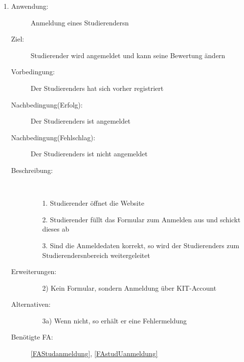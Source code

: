 \documentclass[parskip=full]{scrartcl}
\newcommand{\swtLabel}[1]{\textbf{/#1\arabic*0/}}
\begin{document}
\begin{enumerate}[label=\swtLabel{S}]
  \item \label{UCstudAnmeldung}
    \begin{description}
    \item[Anwendung:] Anmeldung eines \glspl{Studierender}n
    \item[Ziel:] \gls{Studierender} wird angemeldet und kann seine \gls{Bewertung} ändern
  	\item[Vorbedingung:] Der \glspl{Studierender} hat sich vorher registriert
  	\item[Nachbedingung(Erfolg):] Der \glspl{Studierender} ist angemeldet
  	\item[Nachbedingung(Fehlschlag):] Der \glspl{Studierender} ist nicht angemeldet
  	\item[Beschreibung:]~
  	\begin{enumerate}
  	  \item[1.] \gls{Studierender} öffnet die Website
  	  \item[2.] \gls{Studierender} füllt das Formular zum Anmelden aus und schickt
  	  dieses ab %
  	  \item[3.] Sind die Anmeldedaten korrekt, so wird der \glspl{Studierender} zum
  	  \glspl{Studierender}nbereich weitergeleitet
  	\end{enumerate}
  	\item[Erweiterungen:]
  	\begin{enumerate}
  	  \item[2)] Kein Formular, sondern Anmeldung über \gls{KIT-Account}
  	\end{enumerate}    	
  	\item[Alternativen:]
	\begin{enumerate}
  	  \item[3a)] Wenn nicht, so erhält er eine Fehlermeldung
  	\end{enumerate}
  	\item[Benötigte FA:] \ref{FAStudanmeldung}, \ref{FAstudUanmeldung}
  \end{description}
   

\end{enumerate}
\end{document}
